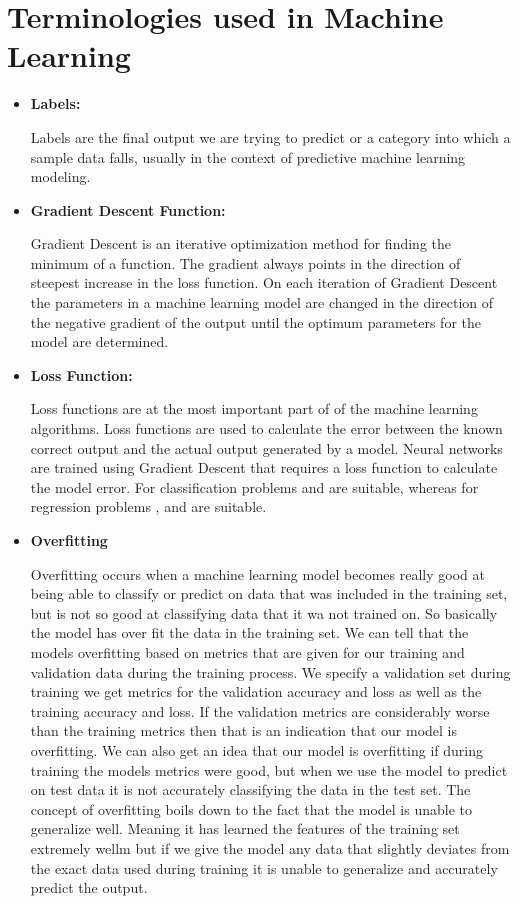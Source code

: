 \section{Terminologies used in Machine Learning}
\begin{itemize}
  \item  \textbf{Labels:}
  \par
  Labels are the final output we are trying to predict or a category into which a sample data falls, usually in the context of predictive machine learning modeling.
  \item  \textbf{Gradient Descent Function:}
  \par
  Gradient Descent is an iterative optimization method for finding the minimum of a function. The gradient always points in the direction of steepest increase in the loss function. On each iteration of Gradient Descent the parameters in a machine learning model are changed in the direction of the negative gradient of the output until the optimum parameters for the model are determined.
  \item \textbf{Loss Function:} 
  \par
  Loss functions are at the most important part of of the machine learning algorithms. Loss functions are used to calculate the error between the known correct output and the actual output generated by a model. Neural networks are trained using Gradient Descent that requires a loss function to calculate the model error. For classification problems  and  are suitable, whereas for regression problems ,  and  are suitable.
  \item  \textbf{Overfitting}
  \par
  Overfitting occurs when a machine learning model becomes really good at being able to classify or predict on data that was included in the training set, but is not so good at classifying data that it wa not trained on. So basically the model has over fit the data in the training set. We can tell that the
  models overfitting based on metrics that are given for our training and validation data during the training process. We specify a validation set during training we get metrics for the validation accuracy and loss as well as the training accuracy and loss. If the validation metrics are considerably worse than the training metrics then that is an indication that our model is overfitting. We can also get an idea that our model is overfitting if during training the models metrics were good, but when we use the model to predict on test data it is not accurately classifying the data in the test set. The concept of overfitting boils down to the fact that the model is unable to generalize well. Meaning it has learned the features of the training set extremely wellm but if we give the model any data that slightly deviates from the exact data used during training it is unable to generalize and accurately predict the output.

\end{itemize}
